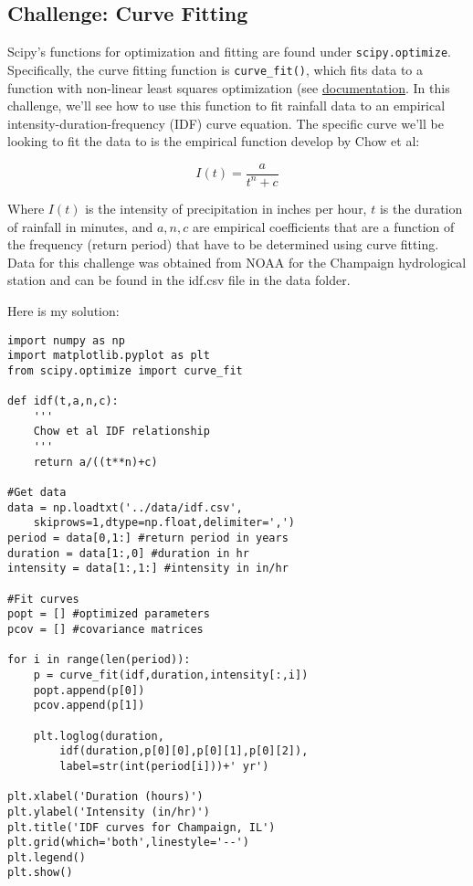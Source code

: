 \documentclass[12pt]{article}
\newcommand{\code}{\texttt}
\begin{document}
\subsection{Challenge: Curve Fitting}
Scipy's functions for optimization and fitting are found under \code{scipy.optimize}. Specifically, the curve fitting function is \code{curve\_fit()}, which fits data to a function with non-linear least squares optimization (see \href{https://docs.scipy.org/doc/scipy/reference/generated/scipy.optimize.curve_fit.html}{documentation}. In this challenge, we'll see how to use this function to fit rainfall data to an empirical intensity-duration-frequency (IDF) curve equation. The specific curve we'll be looking to fit the data to is the empirical function develop by Chow et al:

$$
I(t) = \frac{a}{t^n+c}
$$

Where $I(t)$ is the intensity of precipitation in inches per hour, $t$ is the duration of rainfall in minutes, and $a,n,c$ are empirical coefficients that are a function of the frequency (return period) that have to be determined using curve fitting. Data for this challenge was obtained from NOAA for the Champaign hydrological station and can be found in the idf.csv file in the data folder.

Here is my solution:
\begin{lstlisting}[frame=single] 
import numpy as np
import matplotlib.pyplot as plt
from scipy.optimize import curve_fit

def idf(t,a,n,c):
    '''
    Chow et al IDF relationship
    '''
    return a/((t**n)+c)

#Get data
data = np.loadtxt('../data/idf.csv',
	skiprows=1,dtype=np.float,delimiter=',')
period = data[0,1:] #return period in years
duration = data[1:,0] #duration in hr
intensity = data[1:,1:] #intensity in in/hr

#Fit curves
popt = [] #optimized parameters
pcov = [] #covariance matrices

for i in range(len(period)):
    p = curve_fit(idf,duration,intensity[:,i])
    popt.append(p[0])
    pcov.append(p[1])
    
    plt.loglog(duration,
    	idf(duration,p[0][0],p[0][1],p[0][2]),
    	label=str(int(period[i]))+' yr')

plt.xlabel('Duration (hours)')
plt.ylabel('Intensity (in/hr)')
plt.title('IDF curves for Champaign, IL')
plt.grid(which='both',linestyle='--')
plt.legend()
plt.show()
\end{lstlisting}
\end{document}
